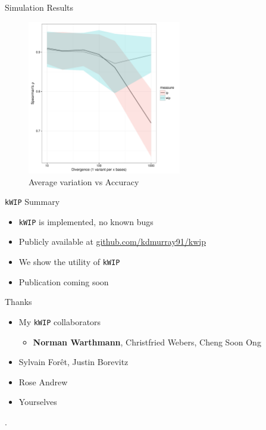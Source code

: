 \documentclass[t]{beamer}
\begin{document}
\begin{frame}{Simulation Results}
  \begin{figure}
    \centering
    \includegraphics[width=0.6\textwidth]{img/variation_vs_accuracy.pdf}
    \caption{Average variation vs Accuracy}
  \end{figure}
\end{frame}

\begin{frame}{\texttt{kWIP} Summary}
  \begin{itemize}
    \item \texttt{kWIP} is implemented, no known bugs
    \item Publicly available at \url{github.com/kdmurray91/kwip}
    \item We show the utility of \texttt{kWIP}
    \item Publication coming soon
  \end{itemize}
\end{frame}
\begin{frame}{Thanks}
  \begin{itemize}
    \item My \texttt{kWIP} collaborators
      \begin{itemize}
        \item \textbf{Norman Warthmann}, Christfried Webers, Cheng Soon Ong
      \end{itemize}
    \item Sylvain For\^{e}t, Justin Borevitz
    \item Rose Andrew
    \item Yourselves
  \end{itemize}
\end{frame}

\begin{frame}[shrink=20]{}
  \printbibliography
  \vfill
  .
\end{frame}
\end{document}

